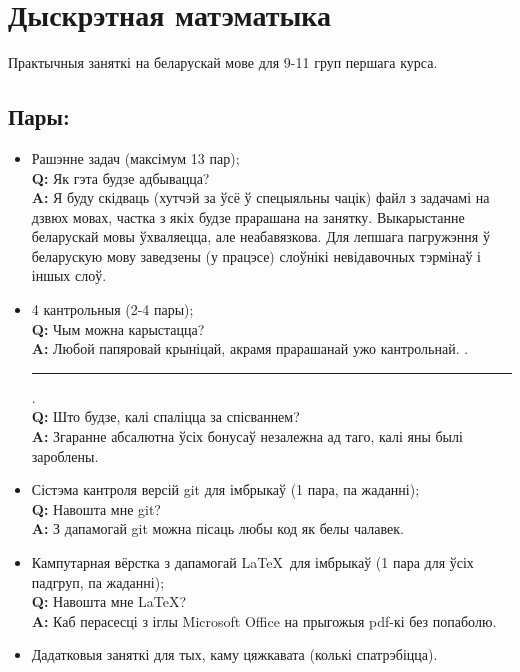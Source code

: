 \documentclass[12pt, a4paper]{extarticle}
\begin{document}
	\section{Дыскрэтная матэматыка}
	Практычныя заняткі на беларускай мове для 9-11 груп першага курса. 	\subsection{Пары:}
	\begin{itemize}
		\item Рашэнне задач (максімум 13 пар); \\[6pt]
		\textbf{Q:} Як гэта будзе адбывацца? \\
		\textbf{A:} Я буду скідваць (хутчэй за ўсё ў спецыяльны чацік) файл з задачамі на дзвюх мовах, частка з якіх будзе прарашана на занятку. Выкарыстанне беларускай мовы ўхваляецца, але неабавязкова. Для лепшага пагружэння ў беларускую мову заведзены (у працэсе) слоўнікі невідавочных тэрмінаў і іншых слоў.
		\item 4 кантрольныя (2-4 пары); \\[6pt]
		\textbf{Q:} Чым можна карыстацца? \\
		\textbf{A:} Любой папяровай крыніцай, акрамя прарашанай ужо кантрольнай. .\noindent\rule{0.5cm}{0.4pt}. \\[6pt]
		\textbf{Q:} Што будзе, калі спаліцца за спісваннем? \\
		\textbf{A:} Згаранне абсалютна ўсіх бонусаў незалежна ад таго, калі яны былі зароблены. 
		\item Сістэма кантроля версій git для імбрыкаў (1 пара, па жаданні); \\[6pt]
		\textbf{Q:} Навошта мне git? \\
		\textbf{A:} З дапамогай git можна пісаць любы код як белы чалавек.
		\item Кампутарная вёрстка з дапамогай \LaTeX~для імбрыкаў (1 пара для ўсіх падгруп, па жаданні); \\[6pt]
		\textbf{Q:} Навошта мне \LaTeX? \\
		\textbf{A:} Каб перасесці з іглы Microsoft Office на прыгожыя pdf-кі без попаболю.
		\item Дадатковыя заняткі для тых, каму цяжкавата (колькі спатрэбіцца).
	\end{itemize}
\end{document}
